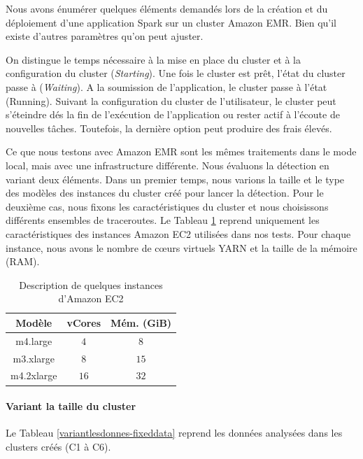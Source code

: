 Nous avons énumérer quelques éléments demandés lors de la création et du déploiement d'une application Spark sur un cluster Amazon EMR. Bien  qu'il existe d'autres paramètres qu'on peut ajuster. 

On distingue le temps nécessaire à la mise en place du cluster et à la configuration du cluster (\textit{Starting}). Une fois le cluster est prêt, l'état du cluster passe à (\textit{Waiting}).  A la soumission de l'application, le cluster passe à l'état (Running). Suivant la configuration du cluster de l'utilisateur, le cluster peut s'éteindre dés la fin de l'exécution de l'application ou rester actif à l'écoute de nouvelles tâches. Toutefois, la dernière option peut produire des frais élevés.  


Ce que nous testons avec Amazon EMR sont les mêmes traitements dans le mode local, mais avec une infrastructure différente. Nous évaluons la détection en variant deux éléments. Dans un premier temps, nous varions la taille et le type des modèles des instances du cluster créé pour lancer la détection. Pour le deuxième cas, nous fixons les caractéristiques du cluster et  nous choisissons différents ensembles de traceroutes. 
Le Tableau \ref{instances-types-description} reprend uniquement les caractéristiques des instances Amazon EC2  utilisées dans nos tests. Pour chaque instance, nous avons le nombre de c\oe{}urs virtuels YARN et la taille de la mémoire (RAM).
\begin{table}[H]
	\centering
\begin{tabular}{c c c}
	\hline 
\textbf{Modèle} &	\textbf{vCores} &\textbf{	Mém. (GiB)} \\ 
	\hline 
m4.large&	$ 4 $&	$ 8 $ \\
	\hline 
m3.xlarge&	$ 8 $&	$ 15 $\\
\hline 
m4.2xlarge&	$ 16 $&	$ 32 $ \\ 
	\hline 
\end{tabular}
\caption{Description de quelques instances d'Amazon EC2}
\label{instances-types-description}
\end{table} 
\paragraph{Variant la taille du cluster}

Le Tableau 	\ref{variantlesdonnes-fixeddata} reprend les données analysées dans les clusters créés (C1 à C6).

\begin{table}[H]
	\centering
	\caption{Les données analysées dans les clusters C1 à C6 }
	\label{variantlesdonnes-fixeddata}
\end{table}

